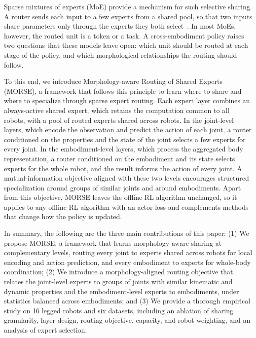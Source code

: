 Sparse mixtures of experts (MoE) provide a mechanism for such selective sharing. A router sends each input to a few
experts from a shared pool, so that two inputs share parameters only through the experts they both
select~\citep{shazeer2017outrageously,fedus2022switch,riquelme2021vmoe}. In most MoEs, however, the routed unit is a
token or a task. A cross-embodiment policy raises two questions that these models leave open: which unit should be
routed at each stage of the policy, and which morphological relationships the routing should follow.

To this end, we introduce Morphology-aware Routing of Shared Experts (MORSE), a framework that follows this principle to
learn where to share and where to specialize through sparse expert routing. Each expert layer
combines an always-active shared expert, which retains the computation common to all robots, with a pool of routed
experts shared across robots. In the joint-level layers, which encode the observation and predict the action of each
joint, a router conditioned on the properties and the state of the joint selects a few experts for every joint. In the
embodiment-level layers, which process the aggregated body representation, a router conditioned on the embodiment and
its state selects experts for the whole robot, and the result informs the action of every joint. A mutual-information
objective aligned with these two levels encourages structured specialization around groups of similar joints and
around embodiments. Apart from this objective, MORSE leaves the offline RL algorithm unchanged, so it applies to any
offline RL algorithm with an actor loss and complements methods that change how the policy is updated.

In summary, the following are the three main contributions of this paper: (1) We propose MORSE, a framework that
learns morphology-aware sharing at complementary levels, routing every joint to experts shared across robots for local
encoding and action prediction, and every embodiment to experts for whole-body coordination; (2) We introduce a
morphology-aligned routing objective that relates the joint-level experts to groups of joints with similar kinematic
and dynamic properties and the embodiment-level experts to embodiments, under statistics balanced across embodiments;
and (3) We provide a thorough empirical study on 16 legged robots and six datasets, including an ablation of sharing
granularity, layer design, routing objective, capacity, and robot weighting, and an analysis of expert selection.

